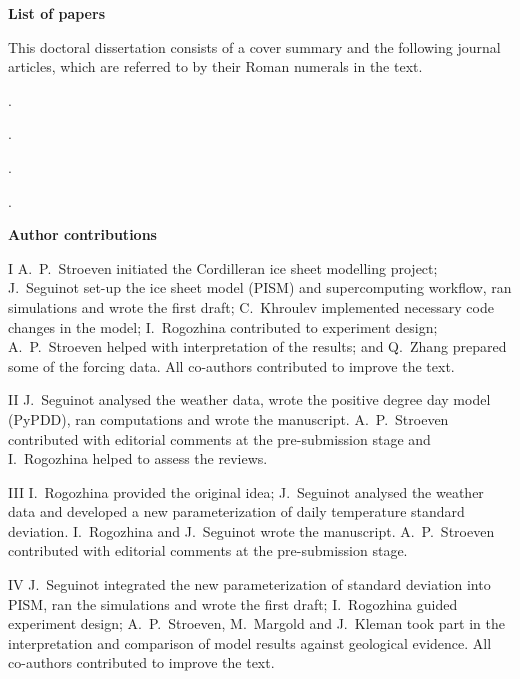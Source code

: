 \documentclass[a4paper]{kappa}
\begin{document}
\begin{frontmatter}
\begin{thepapers}

\textbf{List of papers}

This doctoral dissertation consists of a cover summary and the following
journal articles, which are referred to by their Roman numerals in the text.

\begin{paper}
  \item {}.
  \item {}.
  \item {}.
  \item {}.
\end{paper}

\vfill

\noindent\textbf{Author contributions}
\footnotesize{\begin{paper}
  \item[I] A.~P.~Stroeven initiated the Cordilleran ice sheet modelling
project; J.~Seguinot set-up the ice sheet model (PISM) and supercomputing
workflow, ran simulations and wrote the first draft; C.~Khroulev implemented
necessary code changes in the model; I.~Rogozhina contributed to experiment
design; A.~P.~Stroeven helped with interpretation of the results; and Q.~Zhang
prepared some of the forcing data. All co-authors contributed to improve the
text.
  \item[II] J.~Seguinot analysed the weather data, wrote the positive degree
day model (PyPDD), ran computations and wrote the manuscript. A.~P.~Stroeven
contributed with editorial comments at the pre-submission stage and
I.~Rogozhina helped to assess the reviews.
  \item[III] I.~Rogozhina provided the original idea; J.~Seguinot analysed the
weather data and developed a new parameterization of daily temperature standard
deviation. I.~Rogozhina and J.~Seguinot wrote the manuscript. A.~P.~Stroeven
contributed with editorial comments at the pre-submission stage.
  \item[IV] J.~Seguinot integrated the new parameterization of standard
deviation into PISM, ran the simulations and wrote the first draft;
I.~Rogozhina guided experiment design; A.~P.~Stroeven, M.~Margold and J.~Kleman
took part in the interpretation and comparison of model results against
geological evidence. All co-authors contributed to improve the text.
\end{paper}}

\end{thepapers}

\end{frontmatter}
\end{document}
